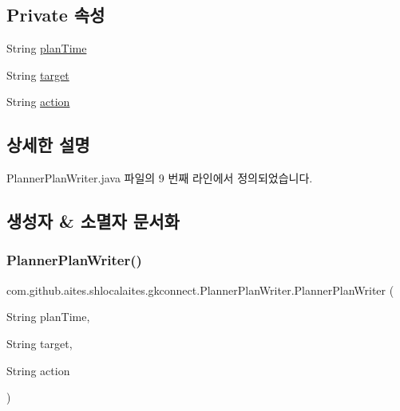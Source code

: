 \subsection*{Private 속성}
\begin{DoxyCompactItemize}
\item 
String \mbox{\hyperlink{classcom_1_1github_1_1aites_1_1shlocalaites_1_1gkconnect_1_1_planner_plan_writer_ad6cb43e87aa18f5f2a27f8adb848ba3e}{plan\+Time}}
\item 
String \mbox{\hyperlink{classcom_1_1github_1_1aites_1_1shlocalaites_1_1gkconnect_1_1_planner_plan_writer_aba8faa2341be4a8571453df2ee7144ab}{target}}
\item 
String \mbox{\hyperlink{classcom_1_1github_1_1aites_1_1shlocalaites_1_1gkconnect_1_1_planner_plan_writer_ac126c52b58b3cca2aa2189e0a2d42979}{action}}
\end{DoxyCompactItemize}


\subsection{상세한 설명}


Planner\+Plan\+Writer.\+java 파일의 9 번째 라인에서 정의되었습니다.



\subsection{생성자 \& 소멸자 문서화}
\mbox{\label{classcom_1_1github_1_1aites_1_1shlocalaites_1_1gkconnect_1_1_planner_plan_writer_a60dc78ce38bec83af5ebdbca1f1a21e0}} 
\subsubsection{\texorpdfstring{Planner\+Plan\+Writer()}{PlannerPlanWriter()}}
{\footnotesize\ttfamily com.\+github.\+aites.\+shlocalaites.\+gkconnect.\+Planner\+Plan\+Writer.\+Planner\+Plan\+Writer (\begin{DoxyParamCaption}\item[{String}]{plan\+Time,  }\item[{String}]{target,  }\item[{String}]{action }\end{DoxyParamCaption})}



